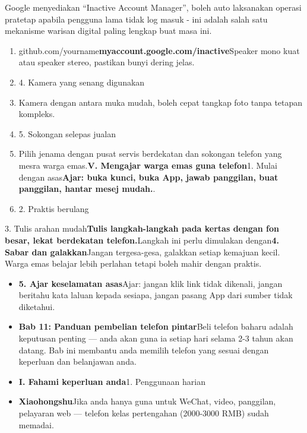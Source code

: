 Google menyediakan “Inactive Account Manager”, boleh auto laksanakan operasi pratetap apabila pengguna lama tidak log masuk - ini adalah salah satu mekanisme warisan digital paling lengkap buat masa ini.

\begin{enumerate}
  \item github.com/yourname\textbf{myaccount.google.com/inactive}Speaker mono kuat atau speaker stereo, pastikan bunyi dering jelas.
  \item 4. Kamera yang senang digunakan
  \item Kamera dengan antara muka mudah, boleh cepat tangkap foto tanpa tetapan kompleks.
  \item 5. Sokongan selepas jualan
  \item Pilih jenama dengan pusat servis berdekatan dan sokongan telefon yang mesra warga emas.\textbf{V. Mengajar warga emas guna telefon}1. Mulai dengan asas\textbf{Ajar: buka kunci, buka App, jawab panggilan, buat panggilan, hantar mesej mudah.}.
  \item 2. Praktis berulang
\end{enumerate}


3. Tulis arahan mudah\textbf{Tulis langkah-langkah pada kertas dengan fon besar, lekat berdekatan telefon.}Langkah ini perlu dimulakan dengan\textbf{4. Sabar dan galakkan}Jangan tergesa-gesa, galakkan setiap kemajuan kecil. Warga emas belajar lebih perlahan tetapi boleh mahir dengan praktis.

\begin{itemize}
  \item \textbf{5. Ajar keselamatan asas}Ajar: jangan klik link tidak dikenali, jangan beritahu kata laluan kepada sesiapa, jangan pasang App dari sumber tidak diketahui.
  \item \textbf{Bab 11: Panduan pembelian telefon pintar}Beli telefon baharu adalah keputusan penting — anda akan guna ia setiap hari selama 2-3 tahun akan datang. Bab ini membantu anda memilih telefon yang sesuai dengan keperluan dan belanjawan anda.
  \item \textbf{I. Fahami keperluan anda}1. Penggunaan harian
  \item \textbf{Xiaohongshu}Jika anda hanya guna untuk WeChat, video, panggilan, pelayaran web — telefon kelas pertengahan (2000-3000 RMB) sudah memadai.
\end{itemize}

